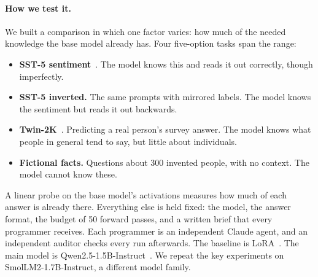 \paragraph{How we test it.} We built a comparison in which one factor varies: how much of the needed knowledge the base model already has. Four five-option tasks span the range:
\begin{itemize}
  \item \textbf{SST-5 sentiment}~\citep{socher2013sst}. The model knows this and reads it out correctly, though imperfectly.
  \item \textbf{SST-5 inverted.} The same prompts with mirrored labels. The model knows the sentiment but reads it out backwards.
  \item \textbf{Twin-2K}~\citep{toubia2025twin}. Predicting a real person's survey answer. The model knows what people in general tend to say, but little about individuals.
  \item \textbf{Fictional facts.} Questions about 300 invented people, with no context. The model cannot know these.
\end{itemize}
A linear probe on the base model's activations measures how much of each answer is already there. Everything else is held fixed: the model, the answer format, the budget of 50 forward passes, and a written brief that every programmer receives. Each programmer is an independent Claude agent, and an independent auditor checks every run afterwards. The baseline is LoRA~\citep{hu2022lora}. The main model is Qwen2.5-1.5B-Instruct~\citep{qwen2025}. We repeat the key experiments on SmolLM2-1.7B-Instruct, a different model family.

